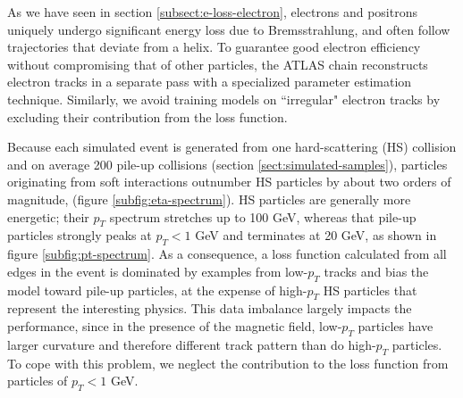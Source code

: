 As we have seen in section \ref{subsect:e-loss-electron}, electrons and positrons uniquely undergo significant energy loss due to Bremsstrahlung, and often follow trajectories that deviate from a helix. 
To guarantee good electron efficiency without compromising that of other particles, the ATLAS chain reconstructs electron tracks in a separate pass with a specialized parameter estimation technique. 
Similarly, we avoid training models on ``irregular" electron tracks by excluding their contribution from the loss function.

Because each simulated event is generated from one hard-scattering (HS) collision and on average 200 pile-up collisions (section \ref{sect:simulated-samples}), particles originating from soft interactions outnumber HS particles by about two orders of magnitude, (figure \ref{subfig:eta-spectrum}). 
HS particles are generally more energetic; their $p_T$ spectrum stretches up to 100 GeV, whereas that pile-up particles strongly peaks at $p_T<1$ GeV and terminates at 20 GeV, as shown in figure \ref{subfig:pt-spectrum}. 
As a consequence, a loss function calculated from all edges in the event is dominated by examples from low-$p_T$ tracks and bias the model toward pile-up particles, at the expense of high-$p_T$ HS particles that represent the interesting physics.
This data imbalance largely impacts the performance, since in the presence of the magnetic field, low-$p_T$ particles have larger curvature and therefore different track pattern than do high-$p_T$ particles.
To cope with this problem, we neglect the contribution to the loss function from particles of $p_T<1$ GeV.

